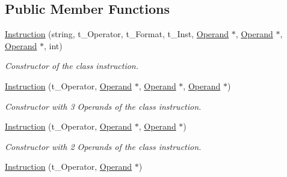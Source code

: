 \subsection*{Public Member Functions}
\begin{DoxyCompactItemize}
\item 
\hypertarget{classInstruction_ae0035f2c32d1a7219ef303014473072f}{
\hyperlink{classInstruction_ae0035f2c32d1a7219ef303014473072f}{Instruction} (string, t\_\-Operator, t\_\-Format, t\_\-Inst, \hyperlink{classOperand}{Operand} $\ast$, \hyperlink{classOperand}{Operand} $\ast$, \hyperlink{classOperand}{Operand} $\ast$, int)}
\label{classInstruction_ae0035f2c32d1a7219ef303014473072f}

\begin{DoxyCompactList}\small\item\em Constructor of the class instruction. \item\end{DoxyCompactList}\item 
\hypertarget{classInstruction_a2f1ed1606d4090b8a4c255e3af9e34c8}{
\hyperlink{classInstruction_a2f1ed1606d4090b8a4c255e3af9e34c8}{Instruction} (t\_\-Operator, \hyperlink{classOperand}{Operand} $\ast$, \hyperlink{classOperand}{Operand} $\ast$, \hyperlink{classOperand}{Operand} $\ast$)}
\label{classInstruction_a2f1ed1606d4090b8a4c255e3af9e34c8}

\begin{DoxyCompactList}\small\item\em Constructor with 3 Operands of the class instruction. \item\end{DoxyCompactList}\item 
\hypertarget{classInstruction_a0b1ed4432c9c5823ee9e522c7d11bb5f}{
\hyperlink{classInstruction_a0b1ed4432c9c5823ee9e522c7d11bb5f}{Instruction} (t\_\-Operator, \hyperlink{classOperand}{Operand} $\ast$, \hyperlink{classOperand}{Operand} $\ast$)}
\label{classInstruction_a0b1ed4432c9c5823ee9e522c7d11bb5f}

\begin{DoxyCompactList}\small\item\em Constructor with 2 Operands of the class instruction. \item\end{DoxyCompactList}\item 
\hypertarget{classInstruction_a6ae2a4dd83500f9d538a653823161b1c}{
\hyperlink{classInstruction_a6ae2a4dd83500f9d538a653823161b1c}{Instruction} (t\_\-Operator, \hyperlink{classOperand}{Operand} $\ast$)}
\label{classInstruction_a6ae2a4dd83500f9d538a653823161b1c}


\end{DoxyCompactItemize}
